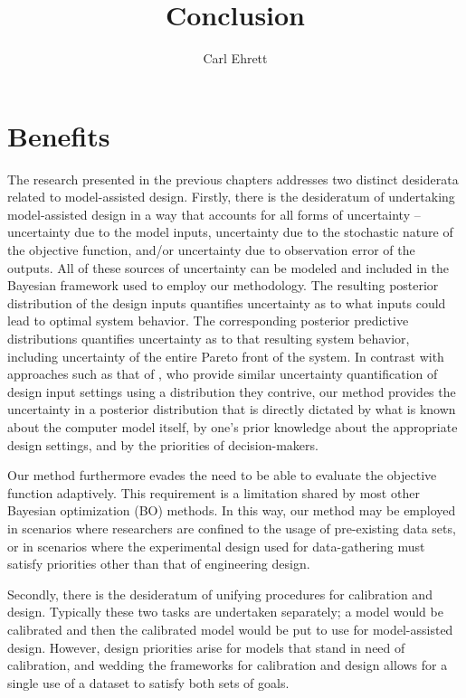 \documentclass[10pt,a4paper]{article}
\author{Carl Ehrett}
\title{Conclusion}
\begin{document}
	
\maketitle

\section{Benefits}

The research presented in the previous chapters addresses two distinct desiderata related to model-assisted design.
Firstly, there is the desideratum of undertaking model-assisted design in a way that accounts for all forms of uncertainty -- uncertainty due to the model inputs, uncertainty due to the stochastic nature of the objective function, and/or uncertainty due to observation error of the outputs.
All of these sources of uncertainty can be modeled and included in the Bayesian framework used to employ our methodology.
The resulting posterior distribution of the design inputs quantifies uncertainty as to what inputs could lead to optimal system behavior.
The corresponding posterior predictive distributions quantifies uncertainty as to that resulting system behavior, including uncertainty of the entire Pareto front of the system.
In contrast with approaches such as that of \citet{Olalotiti-Lawal2015}, who provide similar uncertainty quantification of design input settings using a distribution they contrive, our method provides the uncertainty in a posterior distribution that is directly dictated by what is known about the computer model itself, by one's prior knowledge about the appropriate design settings, and by the priorities of decision-makers.

Our method furthermore evades the need to be able to evaluate the objective function adaptively.
This requirement is a limitation shared by most other Bayesian optimization (BO) methods.
In this way, our method may be employed in scenarios where researchers are confined to the usage of pre-existing data sets, or in scenarios where the experimental design used for data-gathering must satisfy priorities other than that of engineering design.

Secondly, there is the desideratum of unifying procedures for calibration and design.
Typically these two tasks are undertaken separately; a model would be calibrated and then the calibrated model would be put to use for model-assisted design.
However, design priorities arise for models that stand in need of calibration, and wedding the frameworks for calibration and design allows for a single use of a dataset to satisfy both sets of goals.
\end{document}
